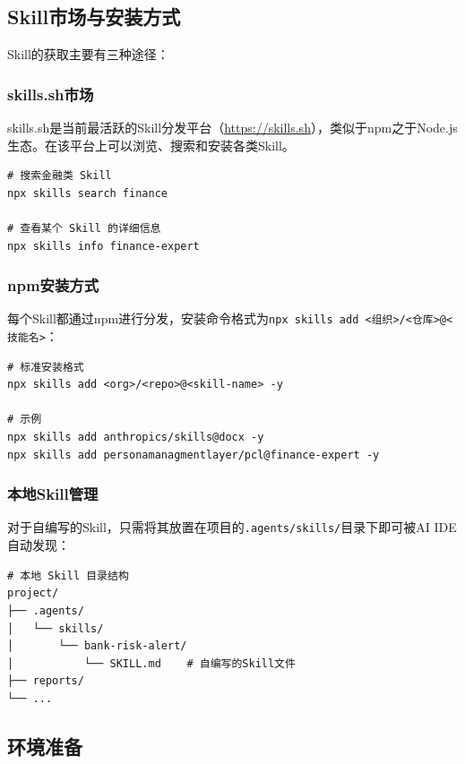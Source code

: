 \subsection{Skill市场与安装方式}

Skill的获取主要有三种途径：

\subsubsection{skills.sh市场}

skills.sh是当前最活跃的Skill分发平台（\url{https://skills.sh}），类似于npm之于Node.js生态。在该平台上可以浏览、搜索和安装各类Skill。

\begin{lstlisting}[style=shell]
# 搜索金融类 Skill
npx skills search finance

# 查看某个 Skill 的详细信息
npx skills info finance-expert
\end{lstlisting}

\subsubsection{npm安装方式}

每个Skill都通过npm进行分发，安装命令格式为\texttt{npx skills add <组织>/<仓库>@<技能名>}：

\begin{lstlisting}[style=shell]
# 标准安装格式
npx skills add <org>/<repo>@<skill-name> -y

# 示例
npx skills add anthropics/skills@docx -y
npx skills add personamanagmentlayer/pcl@finance-expert -y
\end{lstlisting}

\subsubsection{本地Skill管理}

对于自编写的Skill，只需将其放置在项目的\texttt{.agents/skills/}目录下即可被AI IDE自动发现：

\begin{lstlisting}[style=shell]
# 本地 Skill 目录结构
project/
├── .agents/
│   └── skills/
│       └── bank-risk-alert/
│           └── SKILL.md    # 自编写的Skill文件
├── reports/
└── ...
\end{lstlisting}

\subsection{环境准备}

